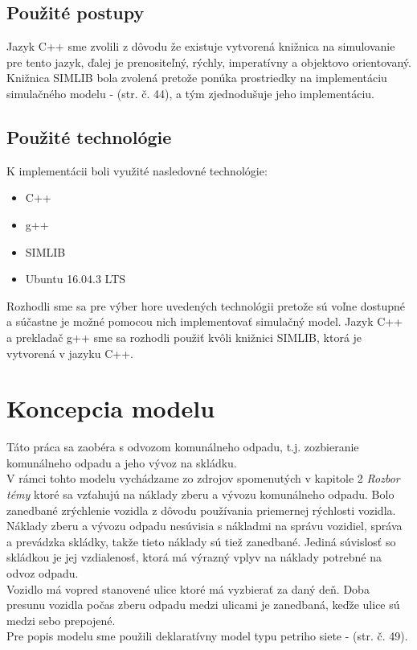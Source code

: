 \documentclass[11pt,a4paper]{article}
\begin{document}
    \subsection{Použité postupy}

        Jazyk C++ sme zvolili z dôvodu že existuje vytvorená knižnica na simulovanie pre tento jazyk, ďalej je prenositeľný, rýchly, imperatívny a objektovo orientovaný. Knižnica SIMLIB bola zvolená pretože ponúka prostriedky na implementáciu simulačného modelu - \cite{IMS}(str. č. 44), a tým zjednodušuje jeho implementáciu.

    \subsection{Použité technológie}

        \noindent K implementácii boli využité nasledovné technológie:
        \begin{itemize}
            \item C++ {}
            \item g++ {}
            \item SIMLIB {}
            \item Ubuntu 16.04.3 LTS {}
        \end{itemize}

        \indent Rozhodli sme sa pre výber hore uvedených technológii pretože sú voľne dostupné a súčastne je možné pomocou nich implementovať simulačný model. Jazyk C++ a prekladač g++ sme sa rozhodli použiť kvôli knižnici SIMLIB, ktorá je vytvorená v jazyku C++.

\section{Koncepcia modelu}

    \indent Táto práca sa zaobéra s odvozom komunálneho odpadu, t.j. zozbieranie komunálneho odpadu a jeho vývoz na skládku.\\[0.4em]
    \indent V rámci tohto modelu vychádzame zo zdrojov spomenutých v kapitole 2 \textit{Rozbor témy} ktoré sa vzťahujú na náklady zberu a vývozu komunálneho odpadu. Bolo zanedbané zrýchlenie vozidla z dôvodu používania priemernej rýchlosti vozidla. Náklady zberu a vývozu odpadu nesúvisia s nákladmi na správu vozidiel, správa a prevádzka skládky, takže tieto náklady sú tiež zanedbané. Jediná súvislosť so skládkou je jej vzdialenosť, ktorá má výrazný vplyv na náklady potrebné na odvoz odpadu.\\[0.4em]
    \indent Vozidlo má vopred stanovené ulice ktoré má vyzbierať za daný deň. Doba presunu vozidla počas zberu odpadu medzi ulicami je zanedbaná, keďže ulice sú medzi sebo prepojené.\\[0.4em]
    \indent Pre popis modelu sme použili deklaratívny model typu petriho siete - \cite{IMS}(str. č. 49).
\end{document}
